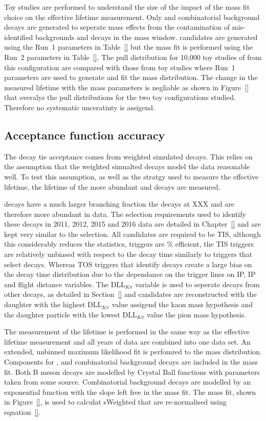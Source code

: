 Toy studies are performed to understand the size of the impact of the mass fit choice on the effective lifetime measurement. Only \bsmumu and combinatorial background decays are generated to seperate mass \pdf effects from the contamination of mis-identified backgrounds and \bdmumu decays in the mass window. \bsmumu candidates are generated using the Run~1 parameters in Table~\ref{} but the mass fit is performed using the Run~2 parameters in Table~\ref{}. The pull distribution for 10,000 toy studies of \Gmumu from this configuration are compared with those from toy studies where Run~1 parameters are used to generate and fit the mass distribution. The change in the measured lifetime with the mass \pdf parameters is negliable as shown in Figure~\ref{} that overalys the pull distributions for the two toy configurations studied. Therefore no systematic unceratinty is assigend. 

\subsection{Acceptance function accuracy}
\label{sec:accptsyst}
The decay tie acceptance comes from weighted simulated decays. This relies on the assumption that the weighted simualted decays model the data reasonable well. To test this assumption, as well as the stratgy used to measure the \bsmumu effective lifetime, the lifetime of the more abundant \bdkpi and \bskk decays are measured.

\bdkpi decays have a much larger branching fraction the \bsmumu decays at XXX and are therefore more abundant in data. The selection requirements used to identify these decays in 2011, 2012, 2015 and 2016 data are detailed in Chapter~\ref{} and are kept very similar to the \bsmumu selection. All candidates are required to be TIS, although this considerably reduces the statistics, \bhh triggers are $\%$ efficient, the TIS triggers are relatively unbiased with respect to the decay time similarly to triggers that select \bsmumu decays. Whereas TOS triggers that identify \bhh decays create a large bias on the decay time distribution due to the dependance on the trigger lines on IP, IP \chisqd and flight distance variables. The DLL$_{K\pi}$ variable is used to seperate \bdkpi decays from other \bhh decays, as detailed in Section~\ref{} and candidates are reconstructed with the daughter with the highest DLL$_{K\pi}$ value assigend the kaon mass hypothesis and the daughter particle with the lowest DLL$_{K\pi}$ value the pion mass hypothesis.

The measurement of the \bdki lifetime is performed in the same way as the \bsmumu effective lifetime measurement and all years of data are combined into one data set. An extended, unbinned maximum likelihood fit is perfomred to the \bdkpi mass distribution. Components for \bdkpi, \bskpi and combinatorial background decays are included in the mass fit. Both B meson decays are modelled by Crystal Ball functions with parameters taken from some source. Combinatorial background decays are modelled by an exponential function with the slope left free in the mass fit. The mass fit, shown in Figure~\ref{}, is used to calculat sWeighted that are re-normalised using equation~\ref{}. 
